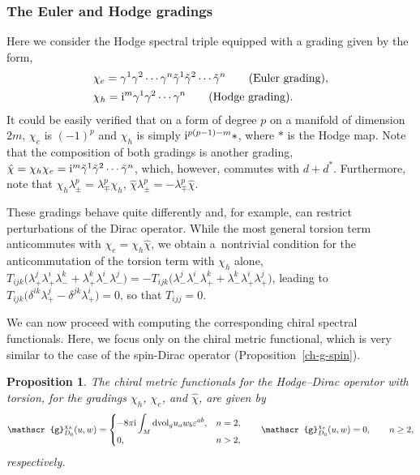 \documentclass[10pt,a4paper]{amsart}
\numberwithin{equation}{section}
\newtheorem{Proposition}[Theorem]{Proposition}
\theoremstyle{definition}
\def\dv{\mathrm{dvol}_g}
\begin{document}
\subsubsection{The Euler and Hodge gradings}
Here we consider the Hodge spectral triple equipped with a grading given by the form,
\begin{align*}
 &\chi_e= \gamma^1 \gamma^2 \cdots \gamma^n \tilde{\gamma}^1 \tilde{\gamma}^2 \cdots \tilde{\gamma}^n \qquad
 \hbox{(Euler grading)}, \\
 &\chi_h ={\rm i}^m \gamma^1 \gamma^2 \cdots \gamma^n
 \qquad \hbox{(Hodge grading)}.
\end{align*}
It could be easily verified that on a form of degree $p$ on a manifold of dimension $2m$, $\chi_e$ is $(-1)^p$ and $\chi_h$ is simply ${\rm i}^{p(p-1)-m} \ast$, where $\ast$ is the Hodge map. Note that the composition of both gradings is another grading, $\hat{\chi}=\chi_h\chi_e={\rm i}^m \tilde{\gamma}^1 \tilde{\gamma}^2 \cdots \tilde{\gamma}^n$, which, however, commutes with $d+d^\ast$.
Furthermore, note that
$
\chi_h \lambda_\pm^p = \lambda_\mp^p \chi_h$,
$
\hat{\chi} \lambda_\pm^p = -\lambda_\mp^p \hat{\chi}$.

These gradings behave quite differently and, for example, can restrict perturbations of the Dirac operator. While the most general torsion term anticommutes with $\chi_e = \chi_h \hat{\chi}$, we obtain a~nontrivial condition for the anticommutation of the torsion term with $\chi_h$ alone, $T_{ijk} \bigl(\lambda^j_+ \lambda^i_+ \lambda^k_- + \lambda^k_+ \lambda^i_- \lambda^j_-\bigr) = - T_{ijk} \bigl(\lambda^j_- \lambda^i_- \lambda^k_+ + \lambda^k_- \lambda^i_+ \lambda^j_+\bigr)$, leading to $T_{ijk} \bigl(\delta^{ik} \lambda^j_+ - \delta^{jk} \lambda^i_+\bigr) = 0$, so that $T_{ijj}=0$.

We can now proceed with computing the corresponding chiral spectral functionals. Here, we focus only on the chiral metric functional, which is very similar to the case of the spin-Dirac operator (Proposition~\ref{ch-g-spin}).
\begin{Proposition}
	The chiral metric functionals for the Hodge--Dirac operator with torsion, for the gradings $\chi_h$, $\chi_e$, and $\hat{\chi}$, are given by
 \begin{gather*}
 \mathscr{g}_{D_0}^{\chi_h}(u,w)=
 \begin{cases}
 \displaystyle -8\pi {\rm i}\int_M\dv u_a w_b \varepsilon^{ab}, & n=2,\\
 0, & n>2,
 \end{cases}
\qquad
 \mathscr{g}_{D_0}^{\chi_e}(u,w)= 0, \qquad n\geq 2,
 \end{gather*}
 respectively.
\end{Proposition}
\end{document}
